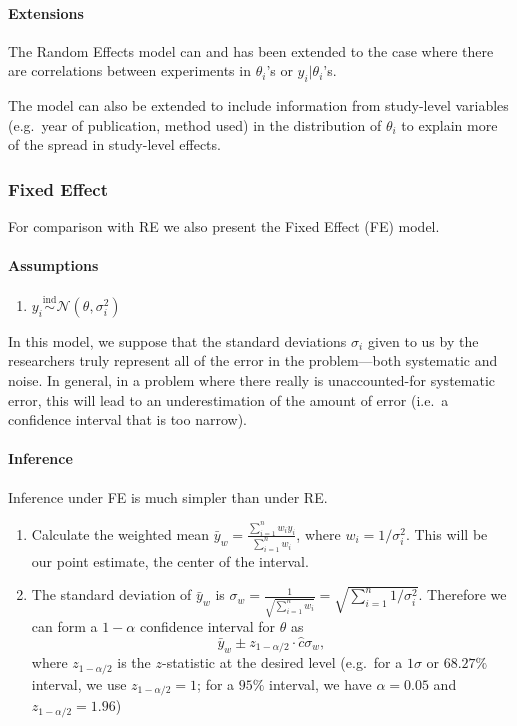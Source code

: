 \documentclass[12pt]{article}
\begin{document}
\paragraph{Extensions}\label{extensions}

The Random Effects model can and has been extended to the case where there are correlations between experiments in $\theta_i$'s or $y_i|\theta_i$'s.

The model can also be extended to include information from study-level variables (e.g.~year of publication, method used) in the distribution of $\theta_i$ to explain more of the spread in study-level effects.

\subsubsection{Fixed Effect}\label{sec:fixed-effect}

For comparison with RE we also present the Fixed Effect (FE) model.

\paragraph{Assumptions}\label{assumptions-1}

\begin{enumerate}
\item
  $y_i\overset{\mathrm{ind}}{\sim}\mathcal{N}(\theta,\sigma_i^2)$
\end{enumerate}

In this model, we suppose that the standard deviations $\sigma_i$ given to us by the researchers truly represent all of the error in the problem---both systematic and noise. In general, in a problem where there really is unaccounted-for systematic error, this will lead to an underestimation of the amount of error (i.e.~a confidence interval that is too narrow).

\paragraph{Inference}\label{inference-1}

Inference under FE is much simpler than under RE.

\begin{enumerate}
\item
  Calculate the weighted mean $\bar{y}_w=\frac{\sum_{i=1}^n w_iy_i}{\sum_{i=1}^nw_i}$, where $w_i=1/\sigma_i^2$. This will be our point estimate, the center of the interval.
\item
  The standard deviation of $\bar{y}_w$ is $\sigma_w=\frac{1}{\sqrt{\sum_{i=1}^nw_i}}=\sqrt{\sum_{i=1}^n1/\sigma_i^2}$. Therefore we can form a $1-\alpha$ confidence interval for $\theta$ as \[\bar{y}_w\pm z_{1-{\alpha/2}}\cdot \hat c\sigma_w,\] where $z_{1-\alpha/2}$ is the $z$-statistic at the desired level (e.g.~for a $1\sigma$ or $68.27\%$ interval, we use $z_{1-\alpha/2}=1$; for a $95\%$ interval, we have $\alpha=0.05$ and $z_{1-\alpha/2}=1.96$)
\end{enumerate}
\end{document}
